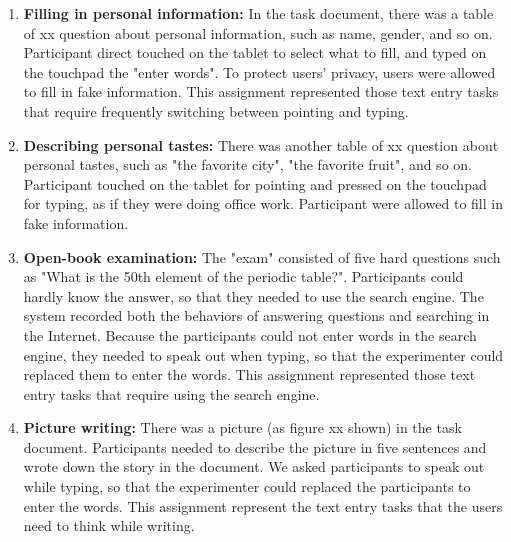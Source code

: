 \begin{enumerate}
	\item{\textbf{Filling in personal information:} In the task document, there was a table of xx question about personal information, such as name, gender, and so on. Participant direct touched on the tablet to select what to fill, and typed on the touchpad the "enter words". To protect users' privacy, users were allowed to fill in fake information. This assignment represented those text entry tasks that require frequently switching between pointing and typing.}
	\item{\textbf{Describing personal tastes:} There was another table of xx question about personal tastes, such as "the favorite city", "the favorite fruit", and so on. Participant touched on the tablet for pointing and pressed on the touchpad for typing, as if they were doing office work. Participant were allowed to fill in fake information.}
	\item{\textbf{Open-book examination:} The "exam" consisted of five hard questions such as "What is the 50th element of the periodic table?". Participants could hardly know the answer, so that they needed to use the search engine. The system recorded both the behaviors of answering questions and searching in the Internet. Because the participants could not enter words in the search engine, they needed to speak out when typing, so that the experimenter could replaced them to enter the words. This assignment represented those text entry tasks that require using the search engine.}
	\item{\textbf{Picture writing:} There was a picture (as figure xx shown) in the task document. Participants needed to describe the picture in five sentences and wrote down the story in the document. We asked participants to speak out while typing, so that the experimenter could replaced the participants to enter the words. This assignment represent the text entry tasks that the users need to think while writing.}
\end{enumerate}


